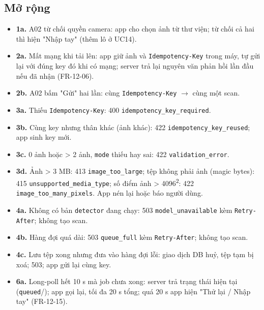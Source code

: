 \subsection{Mở rộng}
\begin{itemize}
\item \textbf{1a.} A02 từ chối quyền camera: app cho chọn ảnh từ thư viện; từ chối cả hai thì hiện "Nhập tay" (thêm lô ở UC14).
\item \textbf{2a.} Mất mạng khi tải lên: app giữ ảnh và {\small\texttt{Idempotency-\allowbreak{}Key}} trong máy, tự gửi lại với đúng key đó khi có mạng; server trả lại nguyên văn phản hồi lần đầu nếu đã nhận (FR-\allowbreak{}12-\allowbreak{}06).
\item \textbf{2b.} A02 bấm "Gửi" hai lần: cùng {\small\texttt{Idempotency-\allowbreak{}Key}} \ensuremath{\rightarrow} cùng một scan.
\item \textbf{3a.} Thiếu {\small\texttt{Idempotency-\allowbreak{}Key}}: 400 {\small\texttt{idempotency\_\allowbreak{}\allowbreak{}key\_\allowbreak{}\allowbreak{}required}}.
\item \textbf{3b.} Cùng key nhưng thân khác (ảnh khác): 422 {\small\texttt{idempotency\_\allowbreak{}\allowbreak{}key\_\allowbreak{}\allowbreak{}reused}}; app sinh key mới.
\item \textbf{3c.} 0 ảnh hoặc > 2 ảnh, {\small\texttt{mode}} thiếu hay sai: 422 {\small\texttt{validation\_\allowbreak{}\allowbreak{}error}}.
\item \textbf{3d.} Ảnh > 3 MB: 413 {\small\texttt{image\_\allowbreak{}\allowbreak{}too\_\allowbreak{}\allowbreak{}large}}; tệp không phải ảnh (magic bytes): 415 {\small\texttt{unsupported\_\allowbreak{}\allowbreak{}media\_\allowbreak{}\allowbreak{}type}}; số điểm ảnh > 4096\textsuperscript{2}: 422 {\small\texttt{image\_\allowbreak{}\allowbreak{}too\_\allowbreak{}\allowbreak{}many\_\allowbreak{}\allowbreak{}pixels}}. App nén lại hoặc báo người dùng.
\item \textbf{4a.} Không có bản {\small\texttt{detector}} đang chạy: 503 {\small\texttt{model\_\allowbreak{}\allowbreak{}unavailable}} kèm {\small\texttt{Retry-\allowbreak{}After}}; không tạo scan.
\item \textbf{4b.} Hàng đợi quá dài: 503 {\small\texttt{queue\_\allowbreak{}\allowbreak{}full}} kèm {\small\texttt{Retry-\allowbreak{}After}}; không tạo scan.
\item \textbf{4c.} Lưu tệp xong nhưng đưa vào hàng đợi lỗi: giao dịch DB huỷ, tệp tạm bị xoá; 503; app gửi lại cùng key.
\item \textbf{6a.} Long-\allowbreak{}poll hết 10 s mà job chưa xong: server trả trạng thái hiện tại ({\small\texttt{queued}}/); app gọi lại, tối đa 20 s tổng; quá 20 s app hiện "Thử lại /\allowbreak{} Nhập tay" (FR-\allowbreak{}12-\allowbreak{}15).

\end{itemize}
